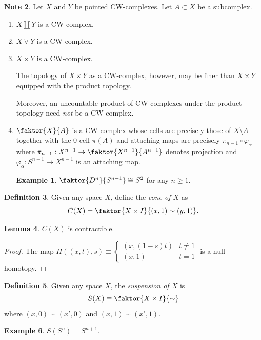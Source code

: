 \documentclass[10pt,letterpaper,cm]{nupset}
\theoremstyle{definition}
\newtheorem{definition}{Definition}[subsection]
\newtheorem{exmp}[definition]{Example}
\newtheorem{note}[definition]{Note}
\theoremstyle{theorem}
\newtheorem{lemma}[definition]{Lemma}
\theoremstyle{remark}
\newcommand{\1}{\mathbb{1}}
\newcommand{\0}{\vec 0}
\begin{document}
\begin{note} Let $X$ and $Y$ be pointed CW-complexes. Let $A\subset X$ be a subcomplex.
\begin{enumerate}
\item $X\coprod Y$ is a CW-complex.
\item $X \vee Y$ is a CW-complex.
\item $X\times Y$ is a CW-complex.

 The topology of $X \times Y$ as a CW-complex, however, may be finer than $X\times Y$ equipped with the product topology. 

Moreover, an uncountable product of CW-complexes under the product topology need \emph{not} be a CW-complex.


\item $\faktor{X}{A}$ is a CW-complex whose cells are precisely those of $X\setminus A$ together with the $0$-cell $\pi(A)$ and attaching maps are precisely $\pi_{n-1} \circ \varphi_{\alpha}$ where $\pi_{n-1} : X^{n-1} \to \faktor{X^{n-1}}{A^{n-1}}$ denotes projection and $\varphi_{\alpha} :S^{n-1} \to X^{n-1}$ is an attaching map. 
\begin{exmp}
$\faktor{D^n}{S^{n-1}} \cong S^2$ for any $n\geq 1$.
\end{exmp}
\end{enumerate}
\end{note}

\begin{definition}
Given any space $X$, define the \textit{cone of $X$} as $$C(X) = \faktor{X\times I}{\left(x,1\right) \sim \left(y,1\right)}.   $$
\end{definition}
\begin{lemma}
$C(X)$ is contractible.
\end{lemma}
\begin{proof}
The map $H((x,t), s) \equiv \begin{cases} \left(x, \left(1-s\right)t\right) & t\ne 1 \\ \left(x,1\right) & t=1
\end{cases}$ is a null-homotopy.
\end{proof}

\begin{definition}
Given any space $X$, the \textit{suspension of $X$} is $$S(X) \equiv\faktor{X\times I}{\sim}$$ where $\left(x,0\right) \sim \left(x', 0\right)$ and $\left(x,1\right) \sim \left(x', 1\right)$. 
\end{definition}
\begin{exmp}
$S(S^n) = S^{n+1}.$
\end{exmp}
\end{document}
